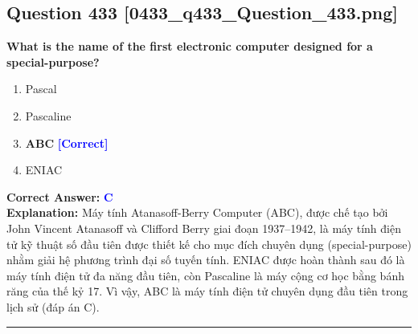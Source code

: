 \documentclass[11pt,a4paper]{article}
\begin{document}
\begin{minipage}{\textwidth}
\subsection*{Question 433 \quad \footnotesize{[0433\_q433\_Question\_433.png]}}
\noindent \textbf{What is the name of the first electronic computer designed for a special-purpose?}

\begin{enumerate}[label=\Alph*.]
    \item Pascal
    \item Pascaline
    \item \textbf{ABC} \hfill \textcolor{blue}{\textbf{[Correct]}}
    \item ENIAC
\end{enumerate}

\noindent \textbf{Correct Answer:} \textcolor{blue}{\textbf{C}} \\[2pt]
\noindent \textbf{Explanation:} Máy tính Atanasoff-Berry Computer (ABC), được chế tạo bởi John Vincent Atanasoff và Clifford Berry giai đoạn 1937–1942, là máy tính điện tử kỹ thuật số đầu tiên được thiết kế cho mục đích chuyên dụng (special-purpose) nhằm giải hệ phương trình đại số tuyến tính. ENIAC được hoàn thành sau đó là máy tính điện tử đa năng đầu tiên, còn Pascaline là máy cộng cơ học bằng bánh răng của thế kỷ 17. Vì vậy, ABC là máy tính điện tử chuyên dụng đầu tiên trong lịch sử (đáp án C).

\par\vspace{0.3cm}
\hrule
\vspace{0.3cm}
\end{minipage}
\end{document}

